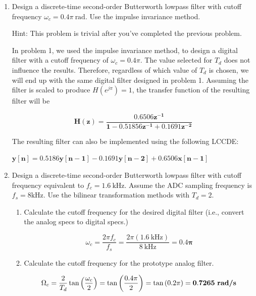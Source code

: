 \documentclass[fleqn]{article}
\begin{document}
\begin{enumerate}[nolistsep]
		\item Design a discrete-time second-order Butterworth lowpass filter with cutoff frequency $\omega_c = 0.4\pi\ \text{rad}$. Use the impulse invariance method.
		
		Hint: This problem is trivial after you've completed the previous problem.
			
		\pagebreak
		In problem 1, we used the impulse invariance method, to design a digital filter with a cutoff frequency of $\omega_c = 0.4\pi$. The value selected for $T_d$ does not influence the results. Therefore, regardless of which value of $T_d$ is chosen, we will end up with the same digital filter designed in problem 1. Assuming the filter is scaled to produce $H(e^{j\pi}) = 1$, the transfer function of the resulting filter will be
		
		\begin{equation*}
			\mathbf{H(z) = \frac{0.6506z^{-1}}{1 - 0.51856z^{-1} + 0.1691z^{-2}}}
		\end{equation*}
		
		The resulting filter can also be implemented using the following LCCDE:
		
		$\mathbf{y[n] = 0.5186y[n-1] - 0.1691y[n-2] + 0.6506x[n-1]}$
		
		\item Design a discrete-time second-order Butterworth lowpass filter with cutoff frequency equivalent to $f_c = 1.6\ \text{kHz}$. Assume the ADC sampling frequency is $f_s = 8 \text{kHz}$. Use the bilinear transformation methods with $T_d = 2$.
		
		\begin{enumerate}
		
			\item Calculate the cutoff frequency for the desired digital filter (i.e., convert the analog specs to digital specs.)
			
			\begin{equation*}
				\omega_c = \frac{2{\pi}f_c}{f_s} = \frac{2{\pi}(1.6\ \text{kHz})}{8\ \text{kHz}} = \mathbf{0.4\pi}
			\end{equation*}
			
			\item Calculate the cutoff frequency for the prototype analog filter.
			
			\begin{equation*}
				\Omega_c = \frac{2}{T_d}\tan{\left(\frac{\omega_c}{2}\right)} = \tan{\left(\frac{0.4\pi}{2}\right)} = \tan{(0.2\pi)} = \mathbf{0.7265\ \text{\textbf{rad/s}}}
			\end{equation*}
			

\end{enumerate}
\end{enumerate}
\end{document}
